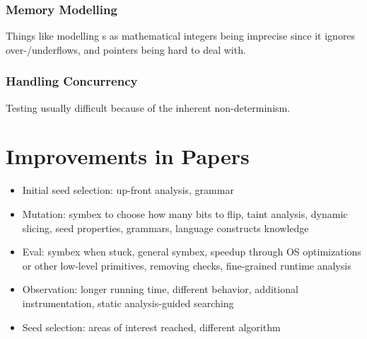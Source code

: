 \documentclass{article}
\begin{document}
\subsubsection{Memory Modelling}
Things like modelling s as mathematical integers being imprecise since it ignores over-/underflows, and pointers being hard to deal with. \cite{ReviewThreeDecades}

\subsubsection{Handling Concurrency}
Testing usually difficult because of the inherent non-determinism. \cite{ReviewThreeDecades}

\section{Improvements in Papers}
\begin{itemize}
    \item Initial seed selection: up-front analysis\cite{Skyfire, Orthrus, DIFUZE}, grammar\cite{QuickFuzz, QuickFuzz2}
    \item Mutation: symbex to choose how many bits to flip\cite{SYMFUZZ}, taint analysis\cite{Mayhem, Angora, Steelix, VUzzer}, dynamic slicing\cite{MutaGen}, seed properties\cite{SDF}, grammars\cite{SCADA, IMF}, language constructs knowledge\cite{Chizpurfle}
    \item Eval: symbex when stuck\cite{Driller, Mayhem}, general symbex\cite{S2F}, speedup through OS optimizations\cite{OS} or other low-level primitives\cite{IMF, VDF, kAFL}, removing checks\cite{TFuzz}, fine-grained runtime analysis\cite{MEDS}
    \item Observation: longer running time\cite{SlowFuzz}, different behavior\cite{NEZHA}, additional instrumentation\cite{Steelix, Angora}, static analysis-guided searching\cite{Dowser, VUzzer}
    \item Seed selection: areas of interest reached\cite{AFLGo, CGF, FairFuzz, VUzzer}, different algorithm\cite{SeedSelection, Scheduling}
\end{itemize}
\end{document}
